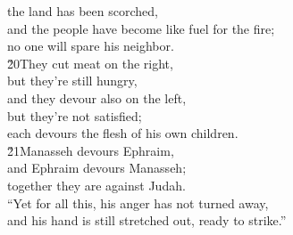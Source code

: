 \begin{poetry}
\poemll    the land has been scorched, \\
\poeml and the people have become like fuel for the fire; \\
\poemlll       no one will spare his neighbor. \\
\poeml \v{20}They cut meat on the right, \\
\poemll    but they're still hungry, \\
\poeml and they devour also on the left, \\
\poemll    but they're not satisfied; \\
\poemlll       each devours the flesh of his own children. \\
\poeml \v{21}Manasseh devours Ephraim, \\
\poemll    and Ephraim devours Manasseh; \\
\poeml together they are against Judah. \\
\poeml ``Yet for all this, his anger has not turned away, \\
\poemll    and his hand is still stretched out, ready to strike.''
\end{poetry}

